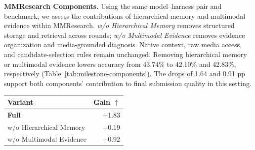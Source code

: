 \medskip
\noindent\begin{minipage}[t]{0.60\linewidth}
\vspace{0pt}
\noindent\textbf{MMResearch Components.}\quad
Using the same model--harness pair and benchmark, we assess the contributions of hierarchical memory and multimodal evidence within MMResearch. \emph{w/o Hierarchical Memory} removes structured storage and retrieval across rounds; \emph{w/o Multimodal Evidence} removes evidence organization and media-grounded diagnosis. Native context, raw media access, and candidate-selection rules remain unchanged. Removing hierarchical memory or multimodal evidence lowers accuracy from 43.74\% to 42.10\% and 42.83\%, respectively (Table~\ref{tab:milestone-components}). The drops of 1.64 and 0.91 pp support both components' contribution to final submission quality in this setting.
\end{minipage}\hfill
\begin{minipage}[t]{0.37\linewidth}
\vspace{0pt}
\centering
\setlength{\abovecaptionskip}{0pt}
\setlength{\belowcaptionskip}{3pt}
\label{tab:milestone-components}
\fontsize{9}{10.4}\selectfont
\setlength{\tabcolsep}{4pt}
\setlength{\extrarowheight}{1pt}
\renewcommand{\arraystretch}{1.3}
\begin{tabularx}{\linewidth}{@{}>{\raggedright\arraybackslash}Xr@{}}
\toprule
\textbf{Variant} & \textbf{Gain} $\uparrow$\\
\midrule
\rowcolor{black!4}\textbf{Full} & +1.83\\
w/o Hierarchical Memory & +0.19\\
w/o Multimodal Evidence & +0.92\\
\bottomrule
\end{tabularx}
\end{minipage}\par
